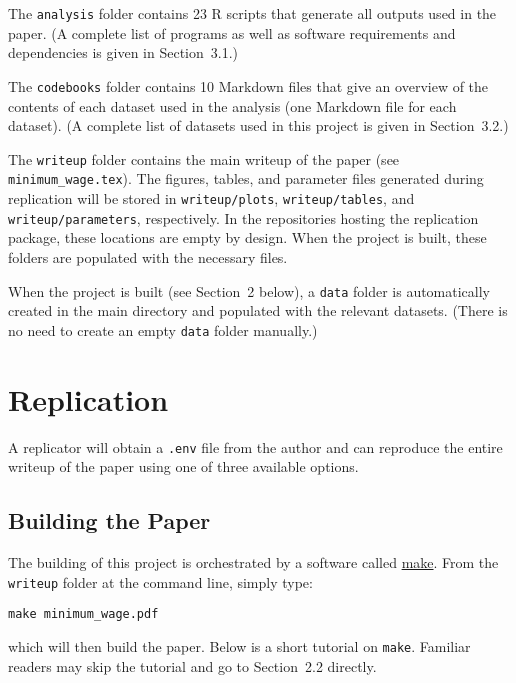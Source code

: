 \documentclass[10pt]{article}
\begin{document}
The \texttt{analysis} folder contains 23 R scripts that generate all outputs used in the paper. (A complete list of programs as well as software requirements and dependencies is given in Section~3.1.)

The \texttt{codebooks} folder contains 10 Markdown files that give an overview of the contents of each dataset used in the analysis (one Markdown file for each dataset). (A complete list of datasets used in this project is given in Section~3.2.)

The \texttt{writeup} folder contains the main writeup of the paper (see \texttt{minimum\_wage.tex}). The figures, tables, and parameter files generated during replication will be stored in \texttt{writeup/plots}, \texttt{writeup/tables}, and \texttt{writeup/parameters}, respectively. In the repositories hosting the replication package, these locations are empty by design. When the project is built, these folders are populated with the necessary files.

When the project is built (see Section~2 below), a \texttt{data} folder is automatically created in the main directory and populated with the relevant datasets. (There is no need to create an empty \texttt{data} folder manually.)

\section{Replication}

A replicator will obtain a \texttt{.env} file from the author and can reproduce the entire writeup of the paper using one of three available options.

\subsection{Building the Paper}

The building of this project is orchestrated by a software called \href{https://www.gnu.org/software/make/manual/make.html}{make}. From the \texttt{writeup} folder at the command line, simply type:
\begin{verbatim}
make minimum_wage.pdf
\end{verbatim}
which will then build the paper. Below is a short tutorial on \texttt{make}. Familiar readers may skip the tutorial and go to Section~2.2 directly.
\end{document}
